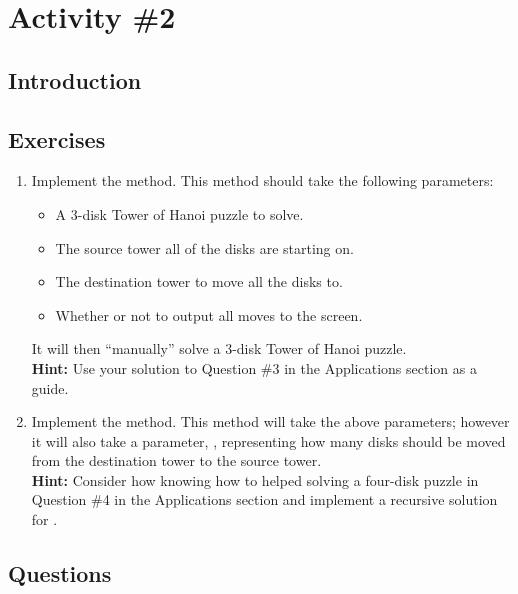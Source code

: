 	\section{Activity \#2}
		\subsection{Introduction}
		\subsection{Exercises}
			\begin{enumerate}
				\item Implement the  method. This method should take the following parameters:
					\begin{itemize}
						\item {} A 3-disk Tower of Hanoi puzzle to solve.
						\item {} The source tower all of the disks are starting on.
						\item {} The destination tower to move all the disks to.
						\item {} Whether or not to output all moves to the screen.
					\end{itemize}
				It will then ``manually'' solve a 3-disk Tower of Hanoi puzzle.\\
				{\small\textbf{Hint:} Use your solution to Question \#3 in the Applications section as a guide.}

				\item Implement the  method. This method will take the above parameters; however it will also take a parameter, , representing how many disks should be moved from the destination tower to the source tower.\\
				{\small\textbf{Hint:} Consider how knowing how to  helped solving a four-disk puzzle in Question \#4 in the Applications section and implement a recursive solution for .}
			\end{enumerate}

		\subsection{Questions}
			\ \\[9pt]

